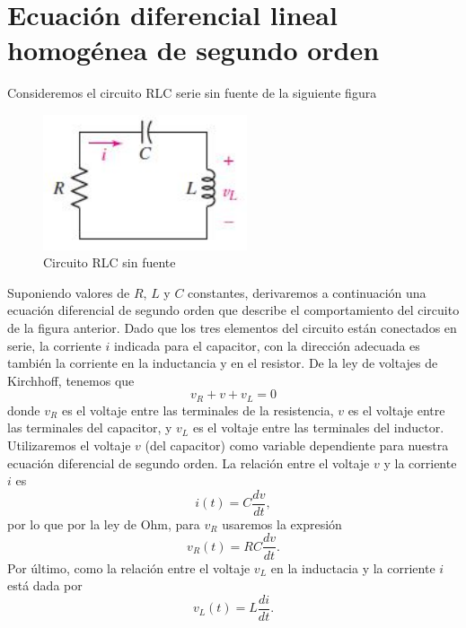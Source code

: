 \documentclass{article}
\begin{document}
\section{Ecuaci\'{o}n diferencial lineal   homog\'{e}nea de segundo orden}
Consideremos el circuito RLC serie sin fuente de la siguiente figura
\begin{figure}[h]
\begin{center}
\includegraphics[width=6cm]{./images/CIRCUITO_RLC_serie.jpg}
\caption{
Circuito RLC sin fuente
}
\end{center}
\end{figure}
Suponiendo valores de $R$, $L$ y $C$ constantes, derivaremos a continuaci\'{o}n una ecuaci\'{o}n diferencial de segundo orden que describe el comportamiento del circuito de la f\/igura anterior. Dado que los tres elementos del circuito est\'{a}n conectados en serie, la corriente $i$ indicada para el capacitor, con la direcci\'{o}n adecuada es tambi\'{e}n la corriente en la inductancia y en el resistor. De la ley de voltajes de Kirchhoff, tenemos que
\begin{equation}
 v_{R}+v+v_{L}=0
 \label{EcuNplus7}
\end{equation}
donde $v_{R}$ es el voltaje entre las terminales de la resistencia, $v$ es el voltaje entre las terminales del capacitor, y $v_{L}$ es el voltaje entre las terminales del inductor. Utilizaremos el voltaje $v$ (del capacitor) como variable dependiente para nuestra ecuaci\'{o}n diferencial de segundo orden. La relaci\'{o}n entre el voltaje $v$ y la corriente $i$ es
\begin{equation}
 i(t)=C\frac{dv}{dt},
 \label{EcuNplus8}
\end{equation}
por lo que por la ley de Ohm, para $v_{R}$ usaremos la expresi\'{o}n
\begin{equation}
 v_{R}(t)=RC\frac{dv}{dt}.
 \label{EcuNplus9}
\end{equation}
Por \'{u}ltimo, como la relaci\'{o}n entre el voltaje $v_{L}$ en la inductacia y la corriente $i$ est\'{a} dada por
\begin{equation}
 v_{L}(t)=L\frac{di}{dt}.
 \label{EcuNplus10}
\end{equation}
\end{document}
